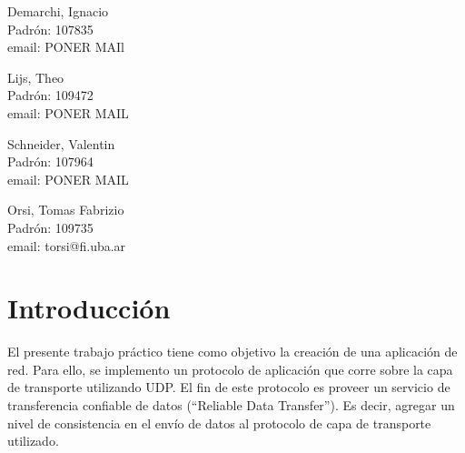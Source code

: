 \documentclass{article}
\begin{document}
\begin{titlepage}
\begin{center}
    {\begin{minipage}{.5\textwidth}
        \begin{center}
          Demarchi, Ignacio\\
          {\small{Padrón: 107835}}\\
          {\small{email: PONER MAIl}}\\
        \end{center}
      \end{minipage}\begin{minipage}{.5\textwidth}
        \begin{center}
          Lijs, Theo\\
          {\small{Padrón: 109472}}\\
          {\small{email: PONER MAIL}}
        \end{center}
      \end{minipage}}

    \vspace{1.0cm}

    {\begin{minipage}{.5\textwidth}
        \begin{center}
          Schneider, Valentin\\
          {\small{Padrón: 107964}}\\
          {\small{email: PONER MAIL}}\\
        \end{center}
      \end{minipage}\begin{minipage}{.5\textwidth}
        \begin{center}
          Orsi, Tomas Fabrizio\\
          {\small{Padrón: 109735}}\\
          {\small{email: torsi@fi.uba.ar}}
        \end{center}
      \end{minipage}}

  \end{center}
\end{titlepage}

\tableofcontents
\pagebreak

\section{\texorpdfstring{\textbf{Introducción}}{Introducción}}\label{introducciuxf3n}

El presente trabajo práctico tiene como objetivo la creación de una aplicación de red. Para ello, se implemento un protocolo de aplicación que corre sobre la capa de transporte utilizando UDP. El fin de este protocolo es proveer un servicio de transferencia confiable de datos (``Reliable Data Transfer''). Es decir, agregar un nivel de consistencia en el envío de datos al protocolo de capa de transporte utilizado.
\end{document}
